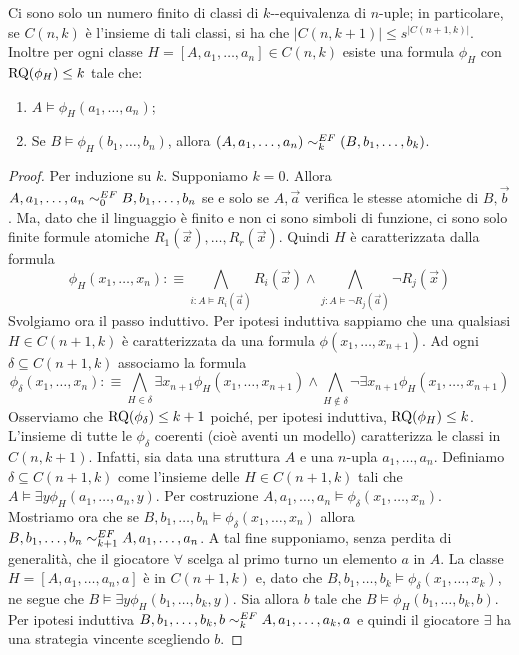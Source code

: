 \begin{lemma}
 Ci sono solo un numero finito di classi di $k$-\EF{}-equivalenza di $n$-uple;
 in particolare, se $C(n,k)$
 è l'insieme di tali classi, si ha che $|C(n,k+1)| \leq s^{|C(n+1,k)|}$. Inoltre per ogni
 classe $H=[A,a_1,\ldots,a_n] \in C(n,k)$ esiste una formula $\phi_H$
 con $\operatorname{RQ}(\phi_H) \leq k$ tale che:
 \begin{enumerate}
  \item $A \models \phi_H(a_1, \ldots, a_n)$;
  \item Se $B \models \phi_H(b_1,\ldots,b_n)$, allora $(A,a_1,\ldots, a_n) \sim^{EF}_k (B,b_1,\ldots,b_k)$.
 \end{enumerate}
 \label{lemma:finite-formulas}
\end{lemma}
\begin{proof}
 Per induzione su $k$. Supponiamo $k=0$. Allora $A,a_1,\ldots,a_n \sim^{EF}_0 B,b_1,\ldots,b_n$
 se e solo se $A,\vec{a}$ verifica le stesse atomiche di $B,\vec{b}$. Ma,
 dato che il linguaggio è finito e non ci sono simboli di funzione,
 ci sono solo finite formule atomiche $R_1(\vec{x}),\ldots, R_r(\vec{x})$.
 Quindi $H$ è caratterizzata dalla formula
 \[\phi_H(x_1,\ldots,x_n) :\equiv \bigwedge_{i : A \models R_i(\vec{a})} R_i(\vec{x}) \land
   \bigwedge_{j : A \models \neg R_j(\vec{a})} \neg R_j(\vec{x})
 \]
 Svolgiamo ora il passo induttivo. Per ipotesi induttiva sappiamo che una qualsiasi
 $H \in C(n+1,k)$ è caratterizzata da una formula $\phi(x_1,\ldots,x_{n+1})$.
 Ad ogni $\delta \subseteq C(n+1,k)$ associamo la formula
 \[\phi_\delta(x_1,\ldots,x_n) :\equiv
 \bigwedge_{H \in \delta} \exists x_{n+1} \phi_H(x_1,\ldots,x_{n+1}) \land
  \bigwedge_{H \not\in \delta} \neg\exists x_{n+1} \phi_H(x_1,\ldots,x_{n+1})
 \]
 Osserviamo che $\operatorname{RQ}(\phi_\delta) \leq k+1$ poiché, per ipotesi induttiva,
 $\operatorname{RQ}(\phi_H) \leq k$. L'insieme di tutte le $\phi_\delta$ coerenti
 (cioè aventi un modello) caratterizza le classi in $C(n,k+1)$.
 Infatti, sia data una struttura $A$ e una $n$-upla $a_1,\ldots,a_n$. Definiamo
 $\delta \subseteq C(n+1,k)$ come l'insieme delle $H \in C(n+1,k)$
 tali che $A \models \exists y \phi_H(a_1,\ldots,a_n,y)$.
 Per costruzione $A,a_1,\ldots,a_n \models \phi_\delta(x_1,\ldots,x_n)$. Mostriamo
 ora che se $B,b_1,\ldots,b_n \models \phi_\delta(x_1,\ldots,x_n)$ allora
 $B,b_1,\ldots,b_n \sim^{EF}_{k+1} A,a_1,\ldots,a_n$. A tal fine supponiamo,
 senza perdita di generalità, che il giocatore $\forall$ scelga al primo turno
 un elemento $a$ in $A$. La classe $H=[A,a_1,\ldots,a_n,a]$ è in $C(n+1, k)$
 e, dato che $B,b_1,\ldots,b_k \models \phi_\delta(x_1,\ldots,x_k)$, ne segue che
 $B \models \exists y \phi_H(b_1,\ldots,b_k,y)$. Sia allora $b$ tale che
 $B \models \phi_H(b_1,\ldots,b_k,b)$. Per ipotesi induttiva
 $B,b_1,\ldots,b_k,b \sim^{EF}_k A,a_1,\ldots,a_k,a$ e quindi il giocatore
 $\exists$ ha una strategia vincente scegliendo $b$.

\end{proof}

